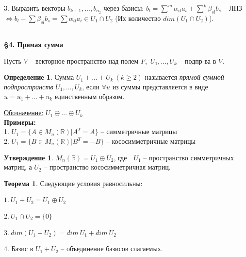 \documentclass[a4paper, 12pt]{article}
\theoremstyle{definition}
\newtheorem*{definition}{Определение}
\newtheorem*{theorem}{Теорема}
\newtheorem*{subtheorem}{Утверждение}
\begin{document}
    3. Выразить векторы $b_{k+1},...,b_{n_2}$ через базисы:
    $b_l = \sum\limits^m\alpha_{il}a_i + \sum\limits^k\beta_{sl}b_s$
    -- ЛНЗ $\Longleftrightarrow b_l - \sum\beta_{sl}b_s =
    \sum\alpha_{il}a_i \in U_1 \cap U_2$ (Их количество $dim(U_1 \cap U_2)$).
    \begin{center}
        \begin{Large}
            \textbf{\\\S4. Прямая сумма}
        \end{Large}
    \end{center}
    Пусть $V$ -- векторное пространство над полем $F$,\
    $U_1,..., U_k$ -- подпр-ва в $V$.
    \begin{definition}
        Сумма $U_1 +...+ U_k \ (k \geqslant 2)$ называется
        \textit{прямой суммой подпространств} $U_1,..., U_k$, если
        $\forall u$ из суммы представляется в виде $u = u_1 +...+u_k$
        единственным образом. 
    \end{definition}
    \underline{Обозначение:} $U_1\oplus...\oplus U_k$\\
    \textbf{Примеры:} \\1. $U_1 = \{A \in M_n(\mathbb{R})|A^T = A\}$
    -- симметричные матрицы\\
    2. $U_1 = \{B \in M_n(\mathbb{R})|B^T = -B\}$
    -- кососимметричные матрицы
    \newpage
    \begin{subtheorem}
        $M_n(\mathbb{R}) = U_1 \oplus U_2$, где\ \ $U_1$ --
        пространство симметричных\\ матриц, а $U_2$ -- 
        пространство кососимметричная матриц.
    \end{subtheorem}
    \begin{theorem}
        Следующие условия равносильны:

        $1.\ U_1 + U_2 = U_1 \oplus U_2$

        $2.\ U_1 \cap U_2 = \{0\}$

        $3.\ dim(U_1 + U_2) = dim\ U_1 + dim\ U_2$

        4. Базис в $U_1 + U_2$ -- объединение базисов слагаемых.
    \end{theorem}
\end{document}

